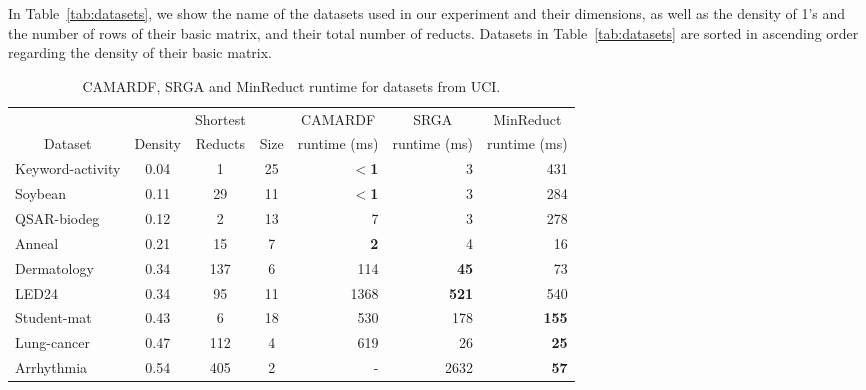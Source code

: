 \documentclass[authoryear,preprint,review,12pt]{elsarticle}
\begin{document}
	In Table~\ref{tab:datasets}, we show the name of the datasets used in our experiment and their dimensions, as well as the density of 1's and the number of rows of their basic matrix, and their total number of reducts. Datasets in Table~\ref{tab:datasets} are sorted in ascending order regarding the density of their basic matrix. 
	
	\begin{table}[tb]
		\footnotesize  
		\centering
		\caption{CAMARDF, SRGA and MinReduct runtime for datasets from UCI.}
		\label{tab:density}
		\begin{tabular}{lcccrrr}
			\hline
			&&Shortest&& \multicolumn{1}{c}{CAMARDF} & \multicolumn{1}{c}{SRGA} & \multicolumn{1}{c}{MinReduct} \\
			\multicolumn{1}{c}{Dataset} & Density  & Reducts & Size & runtime (ms)  & runtime (ms) & runtime (ms)  \\
			\hline
			Keyword-activity & 0.04 & 1    & 25 & \textbf{$<$1} & 3              & 431  \\
			Soybean          & 0.11 & 29   & 11 & \textbf{$<$1} & 3              & 284 \\
			QSAR-biodeg      & 0.12 & 2    & 13 & 7             & 3              & 278 \\
			Anneal           & 0.21 & 15   & 7  & \textbf{2}    & 4              & 16 \\
			Dermatology      & 0.34 & 137  & 6  & 114           & \textbf{45}    & 73   \\
			LED24            & 0.34 & 95   & 11 & 1368          & \textbf{521}   & 540   \\
			Student-mat      & 0.43 & 6    & 18 & 530           & 178            & \textbf{155}  \\
			Lung-cancer      & 0.47 & 112  & 4  & 619           & 26             & \textbf{25}   \\
			Arrhythmia       & 0.54 & 405  & 2  &  -            & 2632           & \textbf{57}   \\

\end{tabular}
\end{table}
\end{document}
